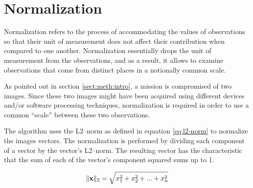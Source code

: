 \section{Normalization} \label{sect:meth:norm}

Normalization refers to the process of accommodating the values of observations so that their unit of measurement does not affect their contribution when compared to one another. Normalization essentially drops the unit of measurement from the observations, and as a result, it allows to examine observations that come from distinct places in a notionally common scale.  \newline

As pointed out in section \ref{sect:meth:intro}, a mission is compromised of two images. Since these two images might have been acquired using different devices and/or software processing techniques, normalization is required in order to use a common ``scale'' between these two observations.  \newline

The \mlblink algorithm uses the L2--norm as defined in equation \ref{eq:l2-norm} to normalize the images vectors. The normalization is performed by dividing each component of a vector by the vector's L2--norm. The resulting vector has the characteristic that the sum of each of the vector's component squared sums up to 1.

\begin{equation} \label{eq:l2-norm}
    \lVert \boldsymbol{\mathbf{x}} \rVert_{2} = \sqrt{x^2_1 + x^2_2 + ... + x^2_n}
\end{equation}